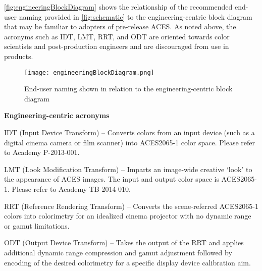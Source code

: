 \label{appendixA}

\autoref{fig:engineeringBlockDiagram} shows the relationship of the recommended end-user naming provided in \autoref{fig:schematic} to the engineering-centric block diagram that may be familiar to adopters of pre-release ACES. As noted above, the acronyms such as IDT, LMT, RRT, and ODT are oriented towards color scientists and post-production engineers and are discouraged from use in products.

\begin{figure}[htbp]
\begin{center}
    \texttt{[image: engineeringBlockDiagram.png]}
\caption{End-user naming shown in relation to the engineering-centric block diagram}
\label{fig:engineeringBlockDiagram}
\end{center}
\end{figure}

\textbf{Engineering-centric acronyms}

IDT (Input Device Transform) -- Converts colors from an input device (such as a digital cinema camera or film scanner) into ACES2065-1 color space. Please refer to Academy P-2013-001.

LMT (Look Modification Transform) -- Imparts an image-wide creative ‘look’ to the appearance of ACES images. The input and output color space is ACES2065-1. Please refer to Academy TB-2014-010.

RRT (Reference Rendering Transform) -- Converts the scene-referred ACES2065-1 colors into colorimetry for an idealized cinema projector with no dynamic range or gamut limitations.

ODT (Output Device Transform) -- Takes the output of the RRT and applies additional dynamic range compression and gamut adjustment followed by encoding of the desired colorimetry for a specific display device calibration aim.


